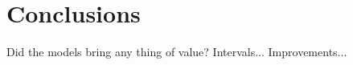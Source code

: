 \chapter{Conclusions}\label{ch:conclusions} 
Did the models bring any thing of value?
Intervals...
Improvements...
